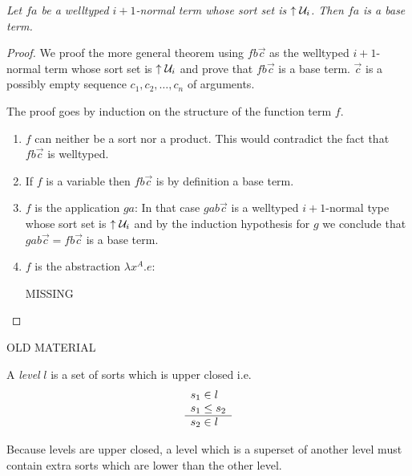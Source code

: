 \begin{theorem}
    \label{th:NormalBaseTerm}
    \emph{Let $fa$ be a welltyped $i+1$-normal term whose sort set is ${{\uparrow {\cal U}_{i}}}$.  Then $fa$ is a base term.}

    \begin{proof}
        We proof the more general theorem using $f b \vec c$ as the welltyped
        $i+1$-normal term whose sort set is ${{\uparrow {\cal U}_{i}}}$ and prove that $f b
        \vec c$ is a base term. $\vec c$ is a possibly empty sequence $c_1, c_2,
        \ldots, c_n$ of arguments.

        The proof goes by induction on the structure of the function term $f$.
        \begin{enumerate}

            \item $f$ can neither be a sort nor a product. This would contradict
                the fact that $f b \vec c$ is welltyped.

            \item If $f$ is a variable then $f b \vec c$ is by definition a base
                term.

            \item $f$ is the application $ga$: In that case $gab\vec c$ is a
                welltyped $i+1$-normal type whose sort set is ${{\uparrow {\cal U}_{i}}}$ and
                by the induction hypothesis for $g$ we conclude that $g a b \vec
                c = f b \vec c$ is a base term.

            \item $f$ is the abstraction $\lambda x^A. e$:

                MISSING
        \end{enumerate}
    \end{proof}
\end{theorem}





\noindent OLD MATERIAL

\begin{definition}
    A \emph{level} $l$ is a set of sorts which is upper closed i.e.
    $$
    \begin{array}{l} s_1 \in l \\ s_1 \le s_2 \\ \hline s_2 \in l\end{array}
    $$
\end{definition}

Because levels are upper closed, a level which is a superset of another level
must contain extra sorts which are lower than the other level.

